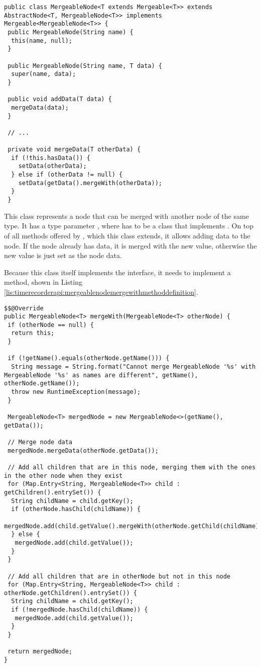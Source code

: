 \begin{lstlisting}[breaklines,caption={MergeableNode class definition},label=lis:timerecorderapi:mergeablenodeclassdefinition]
public class MergeableNode<T extends Mergeable<T>> extends AbstractNode<T, MergeableNode<T>> implements Mergeable<MergeableNode<T>> {
 public MergeableNode(String name) {
  this(name, null);
 }

 public MergeableNode(String name, T data) {
  super(name, data);
 }

 public void addData(T data) {
  mergeData(data);
 }
  
 // ...

 private void mergeData(T otherData) {
  if (!this.hasData()) {
    setData(otherData);
  } else if (otherData != null) {
    setData(getData().mergeWith(otherData));
  }
 }
\end{lstlisting}

\noindent This class represents a node that can be merged with another node of the same type. It has a type parameter , where  has to be a class that implements . On top of all methods offered by , which this class extends, it allows adding data to the node. If the node already has data, it is merged with the new value, otherwise the new value is just set as the node data.

\noindent Because this class itself implements the  interface, it needs to implement a  method, shown in Listing \ref{lis:timerecorderapi:mergeablenodemergewithmethoddefinition}.

\begin{lstlisting}[breaklines,caption={MergeableNode mergeWith method definition},label=lis:timerecorderapi:mergeablenodemergewithmethoddefinition]
$$@Override
public MergeableNode<T> mergeWith(MergeableNode<T> otherNode) {
 if (otherNode == null) {
  return this;
 }

 if (!getName().equals(otherNode.getName())) {
  String message = String.format("Cannot merge MergeableNode '%s' with MergeableNode '%s' as names are different", getName(), otherNode.getName());
  throw new RuntimeException(message);
 }

 MergeableNode<T> mergedNode = new MergeableNode<>(getName(), getData());

 // Merge node data
 mergedNode.mergeData(otherNode.getData());

 // Add all children that are in this node, merging them with the ones in the other node when they exist
 for (Map.Entry<String, MergeableNode<T>> child : getChildren().entrySet()) {
  String childName = child.getKey();
  if (otherNode.hasChild(childName)) {
   mergedNode.add(child.getValue().mergeWith(otherNode.getChild(childName)));
  } else {
   mergedNode.add(child.getValue());
  }
 }

 // Add all children that are in otherNode but not in this node
 for (Map.Entry<String, MergeableNode<T>> child : otherNode.getChildren().entrySet()) {
  String childName = child.getKey();
  if (!mergedNode.hasChild(childName)) {
   mergedNode.add(child.getValue());
  }
 }

 return mergedNode;
}
\end{lstlisting}

